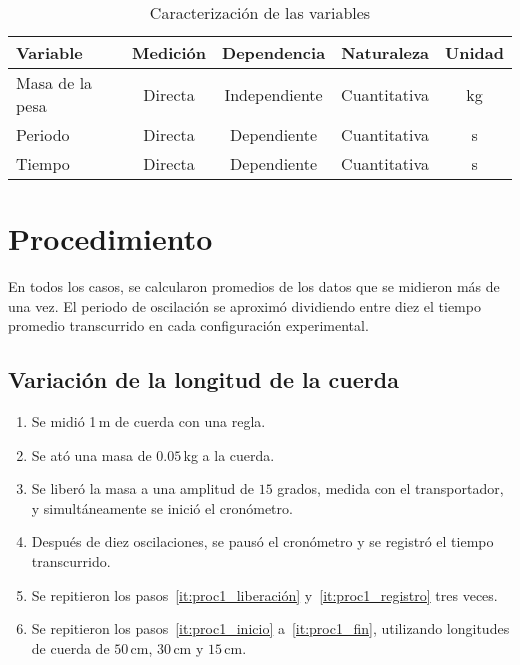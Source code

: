 \documentclass[letterpaper]{report}
\numberwithin{table}{section}
\begin{document}
\begin{table}[h!]
  \centering
  \begin{tabular}{lcccc}
    \toprule
    \textbf{Variable} & \textbf{Medición} & \textbf{Dependencia}
    & \textbf{Naturaleza} & \textbf{Unidad} \\
    \midrule
    Masa de la pesa & Directa & Independiente & Cuantitativa & kg \\
    Periodo & Directa & Dependiente & Cuantitativa & s \\
    Tiempo & Directa & Dependiente & Cuantitativa & s \\
    \bottomrule
  \end{tabular}
  \caption{Caracterización de las variables}\label{tab:masa_variables}
\end{table}

\section{Procedimiento}\label{sec:procedimiento}

En todos los casos, se calcularon promedios de los datos que se
midieron más de una vez. El periodo de oscilación se aproximó
dividiendo entre diez el tiempo promedio transcurrido en cada configuración
experimental.

\subsection{Variación de la longitud de la cuerda}

\begin{enumerate}
  \item Se midió 1\,m de cuerda con una regla.\label{it:proc1_inicio}
  \item Se ató una masa de $0.05$\,kg a la cuerda.
  \item Se liberó la masa a una amplitud de $15$ grados, medida con
    el transportador, y simultáneamente se inició el
    cronómetro.\label{it:proc1_liberación}
  \item Después de diez oscilaciones, se pausó el cronómetro y se
    registró el tiempo transcurrido.\label{it:proc1_registro}
  \item Se repitieron los pasos~\ref{it:proc1_liberación}
    y~\ref{it:proc1_registro} tres veces.\label{it:proc1_fin}
  \item Se repitieron los pasos~\ref{it:proc1_inicio}
    a~\ref{it:proc1_fin}, utilizando longitudes de cuerda de
    $50$\,cm, $30$\,cm y $15$\,cm.
\end{enumerate}
\end{document}
